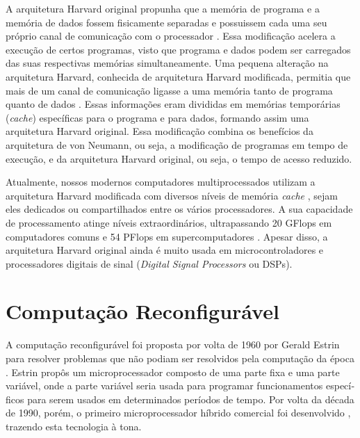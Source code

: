 \documentclass[11pt,a4paper,oneside]{book}
\begin{document}
A arquitetura Harvard original propunha que a mem\'oria de programa e a mem\'oria de dados fossem fisicamente separadas e possuissem cada uma seu pr\'oprio canal de comunica\c{c}\~ao com o processador \cite{Hennessy2011}.
Essa modifica\c{c}\~ao acelera a execu\c{c}\~ao de certos programas, visto que programa e dados podem ser carregados das suas respectivas mem\'orias simultaneamente.
Uma pequena altera\c{c}\~ao na arquitetura Harvard, conhecida de arquitetura Harvard modificada, permitia que mais de um canal de comunica\c{c}\~ao ligasse a uma mem\'oria tanto de programa quanto de dados \cite{Hennessy2011}.
Essas informa\c{c}\~oes eram divididas em mem\'orias tempor\'arias (\textit{cache}) espec\'i­ficas para o programa e para dados, formando assim uma arquitetura Harvard original.
Essa modifica\c{c}\~ao combina os benef\'i­cios da arquitetura de von Neumann, ou seja, a modifica\c{c}\~ao de programas em tempo de execu\c{c}\~ao, e da arquitetura Harvard original, ou seja, o tempo de acesso reduzido.

Atualmente, nossos modernos computadores multiprocessados utilizam a arquitetura Harvard modificada com diversos n\'i­veis de mem\'oria \textit{cache} \cite{Hennessy2011}, sejam eles dedicados ou compartilhados entre os v\'arios processadores.
A sua capacidade de processamento atinge n\'i­veis extraordin\'arios, ultrapassando 20 GFlops em computadores comuns \cite{MaxxPI2013} e 54 PFlops em supercomputadores \cite{Top5002013}.
Apesar disso, a arquitetura Harvard original ainda \'e muito usada em microcontroladores e processadores digitais de sinal (\textit{Digital Signal Processors} ou DSPs).

\section*{Computa\c{c}\~ao Reconfigur\'avel}
\label{ss:computacao_reconfiguravel}
A computa\c{c}\~ao reconfigur\'avel foi proposta por volta de 1960 por Gerald Estrin para resolver problemas que n\~ao podiam ser resolvidos pela computa\c{c}\~ao da \'epoca \cite{Estrin2002}.
Estrin prop\^os um microprocessador composto de uma parte fixa e uma parte vari\'avel, onde a parte vari\'avel seria usada para programar funcionamentos espec\'i­ficos para serem usados em determinados per\'i­odos de tempo.
Por volta da d\'ecada de 1990, por\'em, o primeiro microprocessador h\'i­brido comercial foi desenvolvido \cite{Estrin2002}, trazendo esta tecnologia \`a tona.
\end{document}
